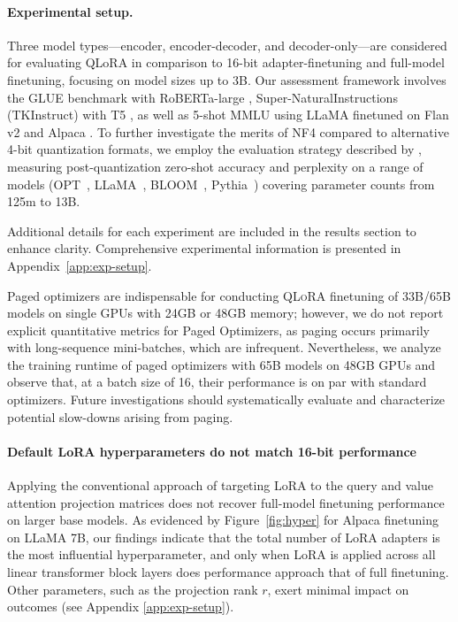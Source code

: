 \paragraph{Experimental setup.} Three model types—encoder, encoder-decoder, and decoder-only—are considered for evaluating QLoRA in comparison to 16-bit adapter-finetuning and full-model finetuning, focusing on model sizes up to 3B. Our assessment framework involves the GLUE benchmark \citep{wang2018glue} with RoBERTa-large \citep{liu2019roberta}, Super-NaturalInstructions (TKInstruct) \citep{wang2022super} with T5 \citep{t5}, as well as 5-shot MMLU \citep{hendrycksmeasuring} using LLaMA finetuned on Flan v2 \citep{longpre2023flan} and Alpaca \citep{alpaca}. To further investigate the merits of NF4 compared to alternative 4-bit quantization formats, we employ the evaluation strategy described by \citet{dettmers2022case}, measuring post-quantization zero-shot accuracy and perplexity on a range of models (OPT~\citep{zhang2022opt}, LLaMA~\citep{touvron2023llama}, BLOOM~\citep{scao2022bloom}, Pythia~\citep{biderman2023pythia}) covering parameter counts from 125m to 13B.

Additional details for each experiment are included in the results section to enhance clarity. Comprehensive experimental information is presented in Appendix~\ref{app:exp-setup}.

Paged optimizers are indispensable for conducting \textsc{QLoRA} finetuning of 33B/65B models on single GPUs with 24GB or 48GB memory; however, we do not report explicit quantitative metrics for Paged Optimizers, as paging occurs primarily with long-sequence mini-batches, which are infrequent. Nevertheless, we analyze the training runtime of paged optimizers with 65B models on 48GB GPUs and observe that, at a batch size of 16, their performance is on par with standard optimizers. Future investigations should systematically evaluate and characterize potential slow-downs arising from paging.

\paragraph{Default LoRA hyperparameters do not match 16-bit performance}

Applying the conventional approach of targeting LoRA to the query and value attention projection matrices \citep{hu2021lora} does not recover full-model finetuning performance on larger base models. As evidenced by Figure~\ref{fig:hyper} for Alpaca finetuning on LLaMA 7B, our findings indicate that the total number of LoRA adapters is the most influential hyperparameter, and only when LoRA is applied across all linear transformer block layers does performance approach that of full finetuning. Other parameters, such as the projection rank $r$, exert minimal impact on outcomes (see Appendix \ref{app:exp-setup}).

